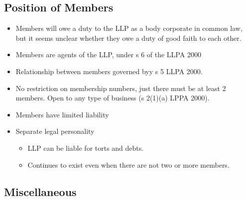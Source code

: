 \documentclass[
]{article}
\providecommand{\tightlist}{%
  \setlength{\itemsep}{0pt}\setlength{\parskip}{0pt}}
\begin{document}
\hypertarget{position-of-members}{%
\subsection{Position of Members}\label{position-of-members}}

\begin{itemize}
\tightlist
\item
  Members will owe a duty to the LLP as a body corporate in common law,
  but it seems unclear whether they owe a duty of good faith to each
  other.
\item
  Members are agents of the LLP, under s 6 of the LLPA 2000
\item
  Relationship between members governed byy s 5 LLPA 2000.
\item
  No restriction on membership numbers, just there must be at least 2
  members. Open to any type of business (s 2(1)(a) LPPA 2000).
\item
  Members have limited liability
\item
  Separate legal personality

  \begin{itemize}
  \tightlist
  \item
    LLP can be liable for torts and debts.
  \item
    Continues to exist even when there are not two or more members.
  \end{itemize}
\end{itemize}

\hypertarget{miscellaneous}{%
\subsection{Miscellaneous}\label{miscellaneous}}
\end{document}
